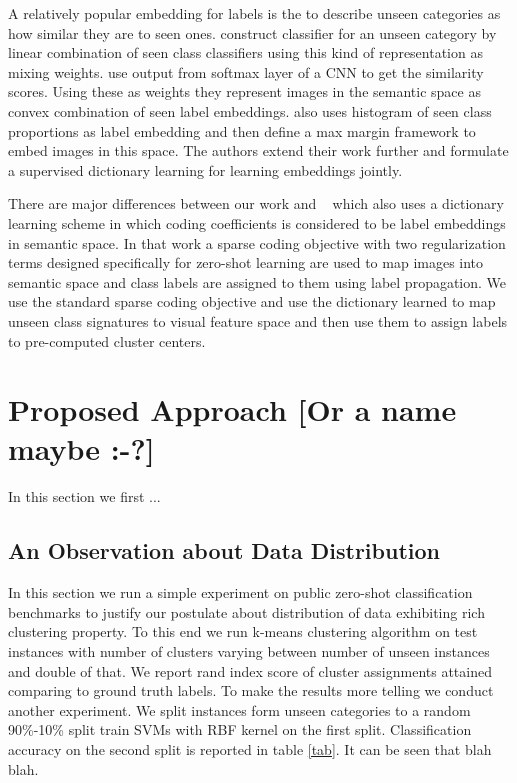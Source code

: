 \documentclass[wcp]{jmlr}
\begin{document}
A relatively popular embedding for labels is the to describe unseen categories as how similar they are to seen ones.
\cite{costa} construct  classifier for an unseen category by linear combination of seen class classifiers
using this kind of representation as mixing weights. \cite{convex} use output from softmax layer of a CNN to get the similarity scores.
Using these as weights they represent images in the semantic space as convex combination of seen label embeddings.
\cite{sse} also uses histogram of seen class proportions as label embedding and then define a max margin framework to embed images
 in this space. The authors extend their work further \cite{agnostic} and formulate a supervised dictionary learning
 for learning embeddings jointly.


There are major differences between our work and  ~\cite{Kodirov2015} which also uses a dictionary learning scheme in which coding coefficients is considered to be
 label embeddings in semantic space. In that work a sparse coding objective with two regularization terms designed specifically for
 zero-shot learning are used to map images into semantic space and class labels are assigned to them using label propagation. We use
 the standard sparse coding objective and use the dictionary learned to map unseen class signatures to visual feature space and then
 use them to assign labels to pre-computed cluster centers.

\section{Proposed Approach [Or a name maybe :-?]}
In this section we first ...

\subsection{An Observation about Data Distribution} \label{observation}
In this section we run a simple experiment on public zero-shot classification benchmarks to justify our
postulate about distribution of data exhibiting rich clustering property. To this end we run k-means clustering
algorithm on test instances with number of clusters varying between number of unseen instances and double of that.
We report rand index score of cluster assignments attained comparing to ground truth labels.
To make the results more telling we conduct another experiment. We split instances form unseen categories
to a random 90\%-10\% split train SVMs with RBF kernel on the first split. Classification accuracy on the second split is reported in table \ref{tab}.
It can be seen that blah blah.%
\end{document}
